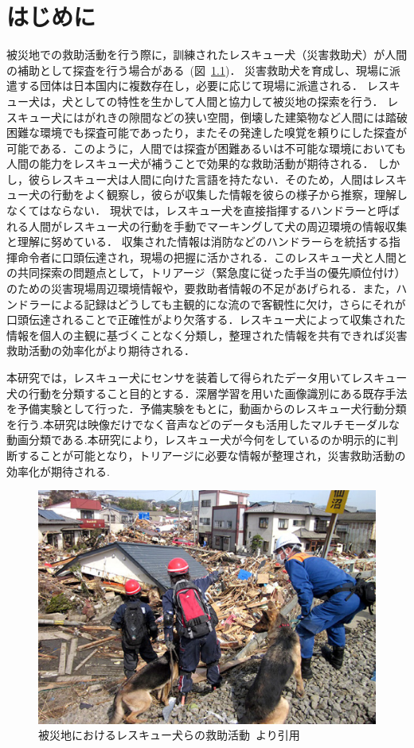 \chapter{はじめに}
被災地での救助活動を行う際に，訓練されたレスキュー犬（災害救助犬）が人間の補助として探査を行う場合がある~(図~\ref{resque})．
災害救助犬を育成し、現場に派遣する団体は日本国内に複数存在し，必要に応じて現場に派遣される．
レスキュー犬は，犬としての特性を生かして人間と協力して被災地の探索を行う．
レスキュー犬にはがれきの隙間などの狭い空間，倒壊した建築物など人間には踏破困難な環境でも探査可能であったり，またその発達した嗅覚を頼りにした探査が可能である．このように，人間では探査が困難あるいは不可能な環境においても人間の能力をレスキュー犬が補うことで効果的な救助活動が期待される．
しかし，彼らレスキュー犬は人間に向けた言語を持たない．そのため，人間はレスキュー犬の行動をよく観察し，彼らが収集した情報を彼らの様子から推察，理解しなくてはならない．
現状では，レスキュー犬を直接指揮するハンドラーと呼ばれる人間がレスキュー犬の行動を手動でマーキングして犬の周辺環境の情報収集と理解に努めている．
収集された情報は消防などのハンドラーらを統括する指揮命令者に口頭伝達され，現場の把握に活かされる．このレスキュー犬と人間との共同探索の問題点として，トリアージ（緊急度に従った手当の優先順位付け）のための災害現場周辺環境情報や，要救助者情報の不足があげられる．また，ハンドラーによる記録はどうしても主観的にな流ので客観性に欠け，さらにそれが口頭伝達されることで正確性がより欠落する．レスキュー犬によって収集された情報を個人の主観に基づくことなく分類し，整理された情報を共有できれば災害救助活動の効率化がより期待される．

本研究では，レスキュー犬にセンサを装着して得られたデータ用いてレスキュー犬の行動を分類すること目的とする．深層学習を用いた画像識別にある既存手法を予備実験として行った．予備実験をもとに，動画からのレスキュー犬行動分類を行う.本研究は映像だけでなく音声などのデータも活用したマルチモーダルな動画分類である.本研究により，レスキュー犬が今何をしているのか明示的に判断することが可能となり，トリアージに必要な情報が整理され，災害救助活動の効率化が期待される.
\begin{figure}[htbp]
 \begin{center}
  \includegraphics[width=12cm]{./Figures/resque.eps}
  \caption{被災地におけるレスキュー犬らの救助活動~\cite{buycott}より引用}
  \label{resque}
 \end{center}
\end{figure}
